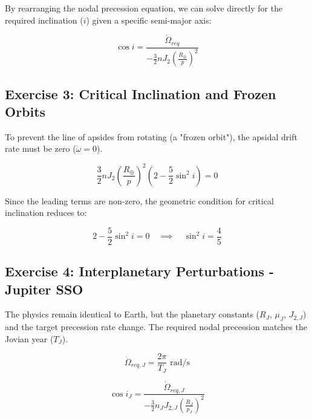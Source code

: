 \documentclass[12pt]{article}
\begin{document}
By rearranging the nodal precession equation, we can solve directly for the required inclination ($i$) given a specific semi-major axis:

\begin{equation}
    \cos i = \frac{\dot{\Omega}_{req}}{-\frac{3}{2} n J_2 \left( \frac{R_{\oplus}}{p} \right)^2}
\end{equation}


\subsection*{Exercise 3: Critical Inclination and Frozen Orbits}
To prevent the line of apsides from rotating (a "frozen orbit"), the apsidal drift rate must be zero ($\dot{\omega} = 0$). 

\begin{equation}
    \frac{3}{2} n J_2 \left( \frac{R_{\oplus}}{p} \right)^2 \left( 2 - \frac{5}{2} \sin^2 i \right) = 0
\end{equation}

Since the leading terms are non-zero, the geometric condition for critical inclination reduces to:

\begin{equation}
    2 - \frac{5}{2} \sin^2 i = 0 \quad \implies \quad \sin^2 i = \frac{4}{5}
\end{equation}


\subsection*{Exercise 4: Interplanetary Perturbations - Jupiter SSO}
The physics remain identical to Earth, but the planetary constants ($R_J$, $\mu_J$, $J_{2,J}$) and the target precession rate change. The required nodal precession matches the Jovian year ($T_J$).

\begin{equation}
    \dot{\Omega}_{req, J} = \frac{2\pi}{T_{J}} \text{ rad/s}
\end{equation}

\begin{equation}
    \cos i_J = \frac{\dot{\Omega}_{req, J}}{-\frac{3}{2} n_J J_{2,J} \left( \frac{R_J}{p_J} \right)^2}
\end{equation}
\end{document}
